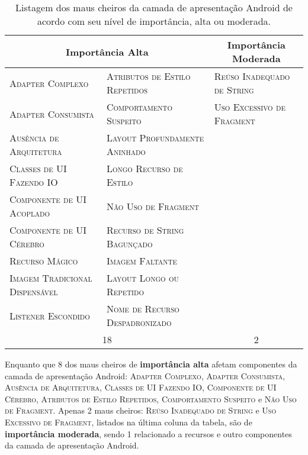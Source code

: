 \begin{table}[!htb]
\centering
\renewcommand*{\arraystretch}{1}
\footnotesize 
\caption{Listagem dos maus cheiros da camada de apresentação Android de acordo com seu nível de importância, alta ou moderada.}
\begin{tabular}{@{}p{5.2cm}p{5.2cm}p{5.2cm}@{}}
\toprule
\multicolumn{2}{c}{\textbf{Importância Alta}} & \multicolumn{1}{c}{\textbf{Importância Moderada}}  \\ 
\bottomrule
\textsc{\scriptsize Adapter Complexo}              & \textsc{\scriptsize Atributos de Estilo Repetidos} & \textsc{\scriptsize Reúso Inadequado de String} \\ 
\textsc{\scriptsize Adapter Consumista}            & \textsc{\scriptsize Comportamento Suspeito}        & \textsc{\scriptsize Uso Excessivo de Fragment} \\ 
\textsc{\scriptsize Ausência de Arquitetura}       & \textsc{\scriptsize Layout Profundamente Aninhado} \\ 
\textsc{\scriptsize Classes de UI Fazendo IO}      & \textsc{\scriptsize Longo Recurso de Estilo}       \\ 
\textsc{\scriptsize Componente de UI Acoplado}     & \textsc{\scriptsize Não Uso de Fragment}           \\ 
\textsc{\scriptsize Componente de UI Cérebro}      & \textsc{\scriptsize Recurso de String Bagunçado}   \\ 
\textsc{\scriptsize Recurso Mágico}                & \textsc{\scriptsize Imagem Faltante}               \\ 
\textsc{\scriptsize Imagem Tradicional Dispensável}& \textsc{\scriptsize Layout Longo ou Repetido}      \\ 
\textsc{\scriptsize Listener Escondido}            & \textsc{\scriptsize Nome de Recurso Despadronizado}\\ 
\toprule
\multicolumn{2}{c}{18} & \multicolumn{1}{c}{2}  \\ 
\bottomrule
\end{tabular}
\label{tab:SmellImportance}
\end{table}

Enquanto que 8 dos maus cheiros de \textbf{\small importância alta} afetam componentes da camada de apresentação Android: \textsc{\small Adapter Complexo}, \textsc{\small Adapter Consumista}, \textsc{\small Ausência de Arquitetura}, \textsc{\small Classes de UI Fazendo IO}, \textsc{\small Componente de UI Cérebro}, \textsc{\small Atributos de Estilo Repetidos}, \textsc{\small Comportamento Suspeito} e \textsc{\small Não Uso de Fragment}. Apenas 2 maus cheiros: \textsc{\small Reúso Inadequado de String} e \textsc{\small Uso Excessivo de Fragment}, listados na última coluna da tabela, são de \textbf{\small importância moderada}, sendo 1 relacionado a recursos e outro componentes da camada de apresentação Android. 

